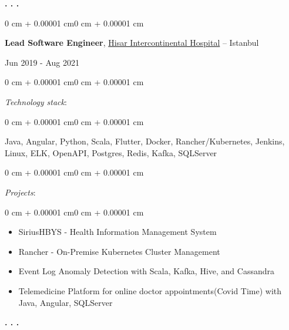 \documentclass[10pt, letterpaper]{article}
\newenvironment{highlights}{
    \begin{itemize}[
        topsep=0.10 cm,
        parsep=0.10 cm,
        partopsep=0pt,
        itemsep=0pt,
        leftmargin=0 cm + 10pt]
}{
    \end{itemize}} %
\newenvironment{onecolentry}{
    \begin{adjustwidth}{0 cm + 0.00001 cm}{0 cm + 0.00001 cm}
}{
    \end{adjustwidth}}
\newenvironment{twocolentry}[2][]{
    \onecolentry
    \def\secondColumn{#2}
    \setcolumnwidth{\fill, 4.5 cm}
    \begin{paracol}{2}
}{
    \switchcolumn \raggedleft \secondColumn
    \end{paracol}
    \endonecolentry
} %
\begin{document}
        \begin{center}
            \textbf{. . .}
        \end{center}

        \begin{twocolentry}{Jun 2019 - Aug 2021}
            \textbf{Lead Software Engineer}, \href{https://hisarhospital.com/}{Hisar Intercontinental Hospital} -- Istanbul
        \end{twocolentry}
            \begin{onecolentry}
                \textit{Technology stack}:
            \end{onecolentry}
            \begin{onecolentry}
                \begin{highlights}
                    Java, Angular, Python, Scala, Flutter, Docker, Rancher/Kubernetes, Jenkins, Linux, ELK, OpenAPI, Postgres, Redis, Kafka, SQLServer
                \end{highlights}
            \end{onecolentry}
            \vspace{0.2 cm}
            \begin{onecolentry}
                \textit{Projects}:
            \end{onecolentry}
            \begin{onecolentry}
                \begin{highlights}
                    \item SiriusHBYS - Health Information Management System
                    \item Rancher - On-Premise Kubernetes Cluster Management
                    \item Event Log Anomaly Detection with Scala, Kafka, Hive, and Cassandra
                    \item Telemedicine Platform for online doctor appointments(Covid Time) with Java, Angular, SQLServer
                \end{highlights}
            \end{onecolentry}
            \vspace{0.5 cm}

        \begin{center}
            \textbf{. . .}
        \end{center}
\end{document}
